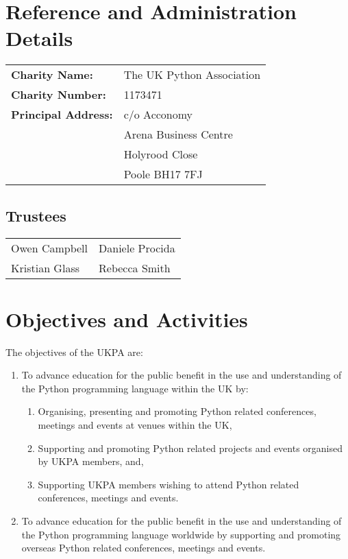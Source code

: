 \documentclass[11pt, final]{article}
\begin{document}

\section{Reference and Administration Details}
\begin{tabular}{l l}
	\textbf{Charity Name:}      & The UK Python Association \\
	\textbf{Charity Number:}    & 1173471                   \\
	\textbf{Principal Address:} & c/o Acconomy              \\
	                            & Arena Business Centre     \\
	                            & Holyrood Close            \\
	                            & Poole BH17 7FJ            \\
\end{tabular}

\subsection{Trustees}
\begin{tabular}{l l}
	Owen Campbell  & Daniele Procida \\
	Kristian Glass & Rebecca Smith \\
\end{tabular}

\section{Objectives and Activities}
The objectives of the UKPA are:
\begin{enumerate}
	\item To advance education for the public benefit in the use and understanding of the Python programming language within the UK by:
	      \begin{enumerate}
		      \item Organising, presenting and promoting Python related conferences, meetings and events at venues within the UK,
		      \item Supporting and promoting Python related projects and events organised by UKPA members, and,
		      \item Supporting UKPA members wishing to attend Python related conferences, meetings and events.
	      \end{enumerate}
	\item To advance education for the public benefit in the use and understanding of the Python programming language worldwide by supporting and promoting overseas Python related conferences, meetings and events.
\end{enumerate}
\end{document}
